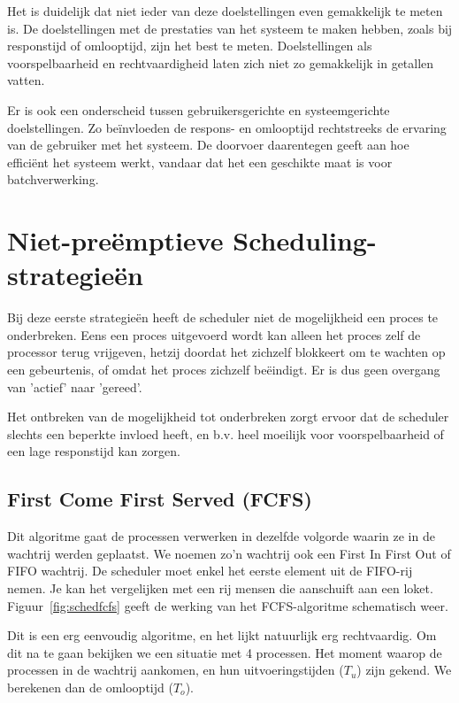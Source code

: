 Het is duidelijk dat niet ieder van deze doelstellingen even
gemakkelijk te meten is. De doelstellingen met de prestaties van het
systeem te maken hebben, zoals bij responstijd of omlooptijd, zijn het
best te meten. Doelstellingen als voorspelbaarheid en rechtvaardigheid
laten zich niet zo gemakkelijk in getallen vatten.

Er is ook een onderscheid tussen gebruikersgerichte en
systeemgerichte doelstellingen. Zo be\"invloeden de respons- en omlooptijd
rechtstreeks de ervaring van de gebruiker met het systeem. De doorvoer
daarentegen geeft aan hoe effici\"ent het systeem werkt, vandaar dat het
een geschikte maat is voor batchverwerking.

\section{Niet-pre\"emptieve Scheduling-strategie\"en}


Bij deze eerste strategie\"en heeft de scheduler niet de
mogelijkheid een proces te onderbreken. Eens een proces uitgevoerd wordt
kan alleen het proces zelf de processor terug vrijgeven, hetzij doordat
het zichzelf blokkeert om te wachten op een gebeurtenis, of omdat het
proces zichzelf be\"eindigt. Er is dus geen overgang van 'actief' naar
'gereed'.

Het ontbreken van de mogelijkheid tot onderbreken zorgt ervoor dat
de scheduler slechts een beperkte invloed heeft, en b.v. heel moeilijk
voor voorspelbaarheid of een lage responstijd kan zorgen.

\subsection{First Come First Served (FCFS)}

Dit algoritme gaat de processen verwerken in dezelfde volgorde
waarin ze in de wachtrij werden geplaatst. We noemen zo'n wachtrij ook
een First In First Out of FIFO wachtrij. De scheduler moet enkel het
eerste element uit de FIFO-rij nemen. Je kan het vergelijken met een
rij mensen die aanschuift aan een loket. Figuur~\ref{fig:schedfcfs} geeft de werking van het FCFS-algoritme schematisch weer.

Dit is een erg eenvoudig algoritme, en het lijkt natuurlijk erg
rechtvaardig. Om dit na te gaan bekijken we een situatie met 4 processen. Het
moment waarop de processen in de wachtrij aankomen, en hun uitvoeringstijden
($T_u$) zijn gekend. We berekenen dan de omlooptijd ($T_o$).

